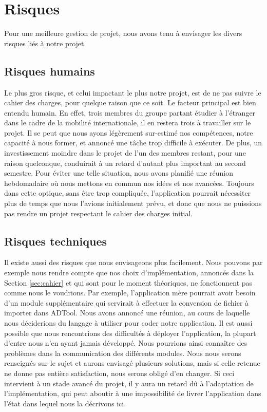 \section{Risques}
    Pour une meilleure gestion de projet, nous avons tenu à envisager les divers risques liés à notre projet.

    \subsection{Risques humains}
		Le plus gros risque, et celui impactant le plus notre projet, est de ne pas suivre le cahier des charges, pour quelque raison que ce soit.
	    Le facteur principal est bien entendu humain. En effet, trois membres du groupe partant étudier à l'étranger dans le cadre de la mobilité internationale, il en restera trois à travailler sur le projet. Il se peut que nous ayons légèrement sur-estimé nos compétences, notre capacité à nous former, et annoncé une tâche trop difficile à exécuter. De plus, un investissement moindre dans le projet de l'un des membres restant, pour une raison quelconque, conduirait à un retard d'autant plus important au second semestre. Pour éviter une telle situation, nous avons planifié une réunion hebdomadaire où nous mettons en commun nos idées et nos avancées. Toujours dans cette optique, sans être trop compliquée, l'application pourrait nécessiter plus de temps que nous l'avions initialement prévu, et donc que nous ne puissions pas rendre un projet respectant le cahier des charges initial.

    \subsection{Risques techniques}
	    Il existe aussi des risques que nous envisageons plus facilement. Nous pouvons par exemple nous rendre compte que nos choix d'implémentation, annoncés dans la Section \ref{sec:cahier} et qui sont pour le moment théoriques, ne fonctionnent pas comme nous le voudrions. Par exemple, l'application mère pourrait avoir besoin d'un module supplémentaire qui servirait à effectuer la conversion de fichier à importer dans ADTool. Nous avons annoncé une réunion, au cours de laquelle nous déciderions du langage à utiliser pour coder notre application.
	    Il est aussi possible que nous rencontrions des difficultés à déployer l'application, la plupart d'entre nous n'en ayant jamais développé. Nous pourrions ainsi connaître des problèmes dans la communication des différents modules. Nous nous serons renseignés sur le sujet et aurons envisagé plusieurs solutions, mais si celle retenue ne donne pas entière satisfaction, nous serons obligé d'en changer. Si ceci intervient à un stade avancé du projet, il y aura un retard dû à l'adaptation de l'implémentation, qui peut aboutir à une impossibilité de livrer l'application dans l'état dans lequel nous la décrivons ici.

